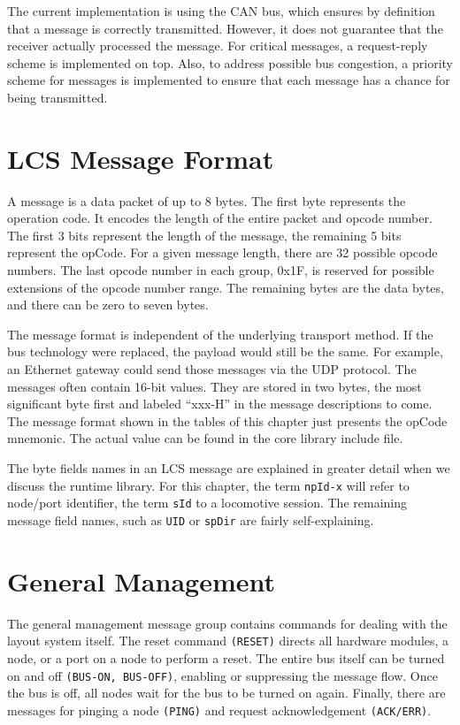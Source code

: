 The current implementation is using the CAN bus, which ensures by definition that a message is correctly transmitted. However, it does not guarantee that the receiver actually processed the message. For critical messages, a request-reply scheme is implemented on top. Also, to address possible bus congestion, a priority scheme for messages is implemented to ensure that each message has a chance for being transmitted.

\section{LCS Message Format}

A message is a data packet of up to 8 bytes. The first byte represents the operation code. It encodes the length of the entire packet and opcode number. The first 3 bits represent the length of the message, the remaining 5 bits represent the opCode. For a given message length, there are 32 possible opcode numbers. The last opcode number in each group, 0x1F, is reserved for possible extensions of the opcode number range. The remaining bytes are the data bytes, and there can be zero to seven bytes. 

The message format is independent of the underlying transport method. If the bus technology were replaced, the payload would still be the same. For example, an Ethernet gateway could send those messages via the UDP protocol. The messages often contain 16-bit values. They are stored in two bytes, the most significant byte first and labeled ``xxx-H'' in the message descriptions to come. The message format shown in the tables of this chapter just presents the opCode mnemonic. The actual value can be found in the core library include file.

The byte fields names in an LCS message are explained in greater detail when we discuss the runtime library. For this chapter, the term \texttt{npId-x} will refer to node/port identifier, the term \texttt{sId} to a locomotive session. The remaining message field names, such as \texttt{UID} or \texttt{spDir} are fairly self-explaining.

\section{General Management}

The general management message group contains commands for dealing with the layout system itself. The reset command \texttt{(RESET)} directs all hardware modules, a node, or a port on a node to perform a reset. The entire bus itself can be turned on and off \texttt{(BUS-ON, BUS-OFF)}, enabling or suppressing the message flow. Once the bus is off, all nodes wait for the bus to be turned on again. Finally, there are messages for pinging a node \texttt{(PING)} and request acknowledgement \texttt{(ACK/ERR)}.

